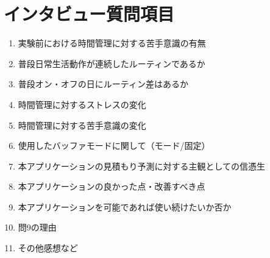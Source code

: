 \chapter{インタビュー質問項目}
  \begin{enumerate}
  \item 実験前における時間管理に対する苦手意識の有無
  \item 普段日常生活動作が連続したルーティンであるか
  \item 普段オン・オフの日にルーティン差はあるか
  \item 時間管理に対するストレスの変化
  \item 時間管理に対する苦手意識の変化
 \item 使用したバッファモードに関して（モード/固定）
  \item 本アプリケーションの見積もり予測に対する主観としての信憑生
  \item 本アプリケーションの良かった点・改善すべき点
  \item 本アプリケーションを可能であれば使い続けたいか否か
  \item 問9の理由
  \item その他感想など
\end{enumerate}